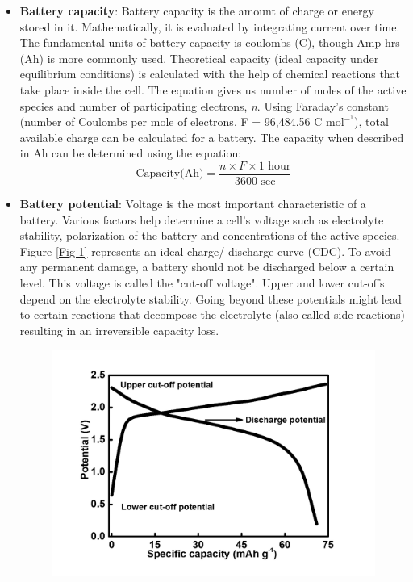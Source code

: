 \begin{itemize}
\item \textbf{Battery capacity}: Battery capacity is the amount of charge or energy stored in it. Mathematically, it is evaluated by integrating current over time. The fundamental units of battery capacity is coulombs (C), though Amp-hrs (Ah) is more commonly used.  Theoretical capacity (ideal capacity under equilibrium conditions) is calculated with the help of chemical reactions that take place inside the cell. The equation gives us number of moles of the active species and number of participating electrons, \textit{n}. Using Faraday’s constant (number of Coulombs per mole of electrons, F = 96,484.56 C mol$^-^1$), total available charge can be calculated for a battery. The capacity when described in Ah can be determined using the equation:
\begin{equation} \label{eq1}
  \text{Capacity(Ah)}=\frac{n \times F \times 1 \text{ hour}}{3600 \text{ sec}}
\end{equation}
\item \textbf{Battery potential}: Voltage is the  most important characteristic of a battery. Various factors help determine a cell's voltage such as electrolyte stability, polarization of the battery and concentrations of the active species. Figure \ref{Fig 1} represents an ideal charge/ discharge curve (CDC). To avoid any permanent damage, a battery should not be discharged below a certain level. This voltage is called the "cut-off voltage". Upper and lower cut-offs depend on the electrolyte stability. Going beyond these potentials might lead to certain reactions that decompose the electrolyte (also called side reactions) resulting in an irreversible capacity loss. 
\begin{figure}[h]
\centering
\includegraphics[width=\textwidth]{Figures/CDCforcellvoltage}

\end{figure}
\end{itemize}
